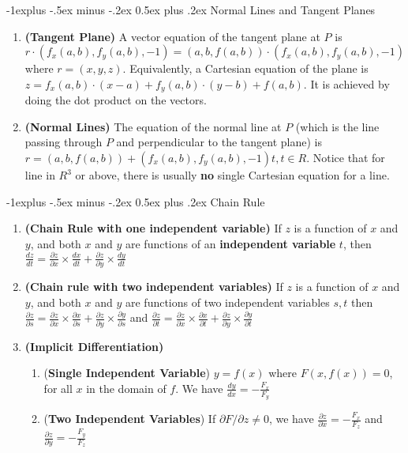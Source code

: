 \documentclass[10pt, landscape]{article}
\makeatletter
\renewcommand{\subsection}{\@startsection{subsection}{2}{0mm}%
                                {-1explus -.5ex minus -.2ex}%
                                {0.5ex plus .2ex}%
                                {\normalfont\normalsize\bfseries}}
\makeatother
\begin{document}
\begin{multicols}{4}
\subsection{Normal Lines and Tangent Planes}
\begin{enumerate}
    \item \textbf{(Tangent Plane)} A vector equation of the tangent plane at $P$ is $r\cdot(f_x(a,b), f_y(a,b), -1)=(a,b,f(a,b))\cdot(f_x(a,b), f_y(a,b), -1)$
    where $r=(x,y,z)$.
    Equivalently, a Cartesian equation of the plane is $z=f_x(a,b)\cdot (x-a) + f_y(a,b)\cdot (y-b) + f(a,b)$. It is achieved by doing the dot product on the vectors.
    \item \textbf{(Normal Lines)} The equation of the normal line at $P$ (which is the line passing through $P$ and perpendicular to the tangent plane) is $r=(a,b,f(a,b))+(f_x(a,b), f_y(a,b), -1)t, t\in R$. Notice that for line in $R^3$ or above, there is usually \textbf{no} single Cartesian equation for a line.
\end{enumerate}

\subsection{Chain Rule}
\begin{enumerate}
    \item \textbf{(Chain Rule with one independent variable)} If $z$ is a function of $x$ and $y$, and both $x$ and $y$ are functions of an \textbf{independent variable} $t$, then $\frac{dz}{dt} = \frac{\partial z}{\partial x} \times \frac{dx}{dt} + \frac{\partial z}{\partial y} \times \frac{dy}{dt}$
    \item \textbf{(Chain rule with two independent variables)} If $z$ is a function of $x$ and $y$, and both $x$ and $y$ are functions of two independent variables $s, t$ then $\frac{\partial z}{\partial s} = \frac{\partial z}{\partial x} \times \frac{\partial x}{\partial s} + \frac{\partial z}{\partial y} \times \frac{\partial y}{\partial s}$ and $\frac{\partial z}{\partial t} = \frac{\partial z}{\partial x} \times \frac{\partial x}{\partial t} + \frac{\partial z}{\partial y} \times \frac{\partial y}{\partial t}$
    \item \textbf{(Implicit Differentiation)}
    \begin{enumerate}
        \item (\textbf{Single Independent Variable}) $y=f(x)$ where $F(x,f(x))=0$, for all $x$ in the domain of $f$. We have $\frac{dy}{dx} =-\frac{F_x}{F_y}$
        \item (\textbf{Two Independent Variables}) If $\partial F / \partial z \neq 0$, we have $\frac{\partial z}{\partial x} = -\frac{F_x}{F_z}$ and $\frac{\partial z}{\partial y} = -\frac{F_y}{F_z}$
    \end{enumerate}
\end{enumerate}


\end{multicols}
\end{document}
